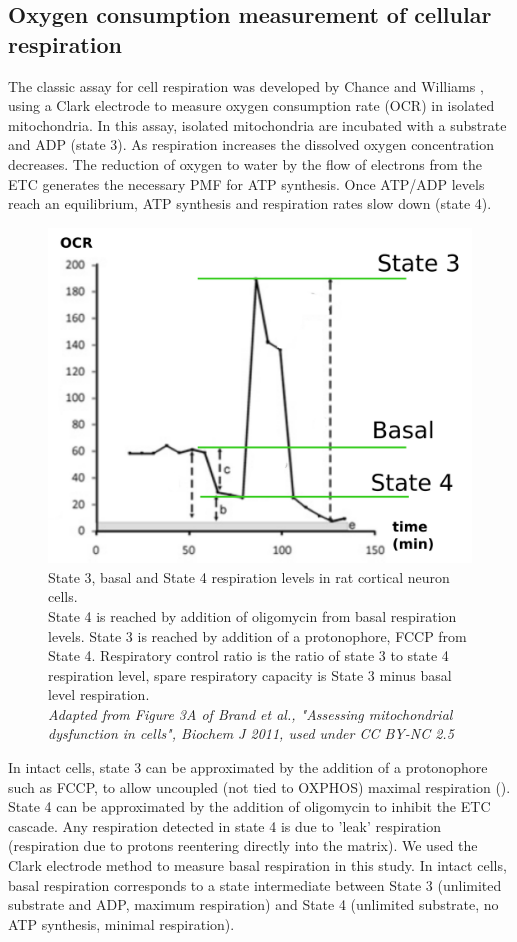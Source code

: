 \subsection{Oxygen consumption measurement of cellular respiration}
The classic assay for cell respiration was developed by Chance and Williams \cite{chance_respiratory_1955}, using a Clark electrode to measure oxygen consumption rate (OCR) in isolated mitochondria. In this assay, isolated mitochondria are incubated with a substrate and ADP (state 3). As respiration increases the dissolved oxygen concentration decreases. The reduction of oxygen to water by the flow of electrons from the ETC generates the necessary PMF for ATP synthesis. Once ATP/ADP levels reach an equilibrium, ATP synthesis and respiration rates slow down (state 4).
%
\begin{figure}[htp]
	\centering
    \includegraphics[width=.65\textwidth]{basal}
    \caption[Definition of State 3, basal and State 4 respiration levels]{State 3, basal and State 4 respiration levels in rat cortical neuron cells.\\State 4 is reached by addition of oligomycin from basal respiration levels. State 3 is reached by addition of a protonophore, FCCP from State 4. Respiratory control ratio is the ratio of state 3 to state 4 respiration level, spare respiratory capacity is State 3 minus basal level respiration.\\\emph{Adapted from Figure 3A of Brand et al., "Assessing mitochondrial dysfunction in cells", Biochem J 2011, used under CC BY-NC 2.5}}\label{fig:basal}
\end{figure}
%

In intact cells, state 3 can be approximated by the addition of a protonophore such as FCCP, to allow uncoupled (not tied to OXPHOS) maximal respiration (). State 4 can be approximated by the addition of oligomycin to inhibit the ETC cascade. Any respiration detected in state 4 is due to 'leak' respiration (respiration due to protons reentering directly into the matrix). We used the Clark electrode method to measure basal respiration in this study. In intact cells, basal respiration corresponds to a state intermediate between State 3 (unlimited substrate and ADP, maximum respiration) and State 4 (unlimited substrate, no ATP synthesis, minimal respiration).
